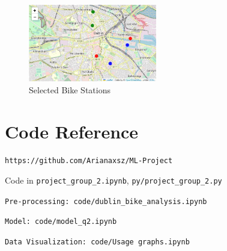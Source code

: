 \documentclass[11pt, singlecolumn, citestyle=authoryear]{elegantbook}
\begin{document}
\begin{figure}[h!]
	\begin{center}
	\includegraphics[width=0.5\textwidth]{../graphs/bikeStationMap.png}
	\caption{Selected Bike Stations}
	\label{fig:stations}
\end{center}

\end{figure}
\section*{Code Reference}
\texttt{https://github.com/Arianaxsz/ML-Project}

Code in \texttt{project\_group\_2.ipynb}, \texttt{py/project\_group\_2.py}

\texttt{Pre-processing: code/dublin\_bike\_analysis.ipynb}

\texttt{Model: code/model\_q2.ipynb}

\texttt{Data Visualization: code/Usage graphs.ipynb}



\end{document}
